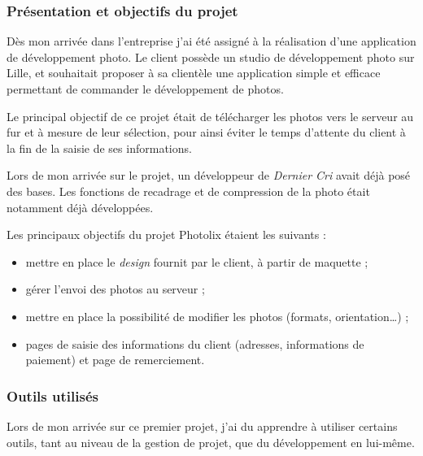 \documentclass[12pt,a4paper]{article}
\providecommand{\tightlist}{%
  \setlength{\itemsep}{0pt}\setlength{\parskip}{0pt}}
\begin{document}
  \subsubsection{Présentation et objectifs du
  projet}\label{pruxe9sentation-et-objectifs-du-projet}

  \bigskip

  Dès mon arrivée dans l'entreprise j'ai été assigné à la réalisation
  d'une application de développement photo. Le client possède un studio de
  développement photo sur Lille, et souhaitait proposer à sa clientèle une
  application simple et efficace permettant de commander le développement
  de photos.

  \bigskip

  Le principal objectif de ce projet était de télécharger les photos vers
  le serveur au fur et à mesure de leur sélection, pour ainsi éviter le
  temps d'attente du client à la fin de la saisie de ses informations.

  \bigskip

  Lors de mon arrivée sur le projet, un développeur de \emph{Dernier Cri}
  avait déjà posé des bases. Les fonctions de recadrage et de compression
  de la photo était notamment déjà développées.

  \bigskip

  Les principaux objectifs du projet Photolix étaient les suivants :

  \begin{itemize}
  \tightlist
  \item
    mettre en place le \emph{design} fournit par le client, à partir de
    maquette ;
  \item
    gérer l'envoi des photos au serveur ;
  \item
    mettre en place la possibilité de modifier les photos (formats,
    orientation\ldots{}) ;
  \item
    pages de saisie des informations du client (adresses, informations de
    paiement) et page de remerciement.
  \end{itemize}

  \bigskip

  \subsubsection{Outils utilisés}\label{outils-utilisuxe9s}

  \bigskip

  Lors de mon arrivée sur ce premier projet, j'ai du apprendre à utiliser
  certains outils, tant au niveau de la gestion de projet, que du
  développement en lui-même.
\end{document}
